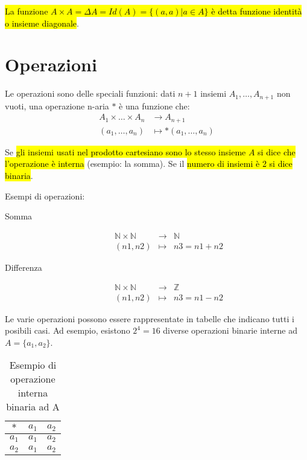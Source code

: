 \documentclass[a4paper,12pt,oneside]{article}
\begin{document}
\hl{La funzione $A \times A = \Delta A = Id(A) = \{(a,a) | a \in A\}$ è detta 
funzione identità o insieme diagonale}.

\section{Operazioni}
Le operazioni sono delle speciali funzioni: dati $n+1$ insiemi 
$A_1, \dots, A_{n+1}$ non vuoti, una operazione n-aria $\ast$ è una funzione
che:
\begin{align*}
    A_1 \times \dots \times A_n &\to A_{n+1} \\
    (a_1, \dots, a_n) &\mapsto \ast (a_1, \dots, a_n)
\end{align*}

Se \hl{gli insiemi usati nel prodotto cartesiano sono lo stesso insieme $A$
si dice che l'operazione è interna} (esempio: la somma). Se il \hl{numero di insiemi è 2 si dice binaria}.

Esempi di operazioni:
\begin{description}
    \item[Somma] \[
        \begin{array}{ccc}
            \mathbb{N} \times \mathbb{N} &\to &\mathbb{N} \\
            (n1, n2) &\mapsto &n3 = n1 + n2
        \end{array} 
    \]
    \item[Differenza] \[
        \begin{array}{ccc}
            \mathbb{N} \times \mathbb{N} &\to &\mathbb{Z} \\
            (n1, n2) &\mapsto &n3 = n1 - n2 
        \end{array}
    \]
\end{description}

Le varie operazioni possono essere rappresentate in tabelle che indicano tutti i
posibili casi. Ad esempio, esistono $2^4 = 16$ diverse operazioni binarie 
interne ad $A = \{a_1, a_2\}$.

\begin{table}[H]
    \centering
    \begin{tabular}{c|cc}
        $\ast$ & $a_1$ & $a_2$ \\
        \midrule
        $a_1$ & $a_1$ & $a_2$ \\
        $a_2$ & $a_1$ & $a_2$ \\
    \end{tabular}
    \caption{Esempio di operazione interna binaria ad A}
\end{table}
\end{document}
